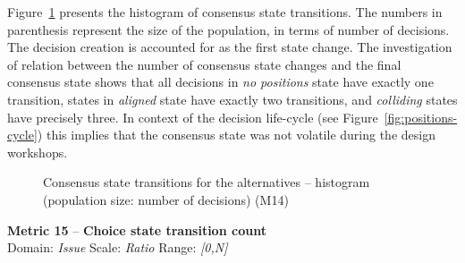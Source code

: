 \documentclass[article]{elsarticle}
\begin{document}
Figure~\ref{fig:M14} presents the histogram of consensus state transitions. The numbers in parenthesis represent the size of the population, in terms of number of decisions. The decision creation is accounted for as the first state change. The investigation of relation between the number of consensus state changes and the final consensus state shows that all decisions in \emph{no positions} state have exactly one transition, states in \emph{aligned} state have exactly two transitions, and \emph{colliding} states have precisely three. In context of the decision life-cycle (see Figure~\ref{fig:positions-cycle}) this implies that the consensus state was not volatile during the design workshops.  
\begin{figure}
  \begin{center}
 

  \caption{Consensus state transitions for the alternatives -- histogram (population size: number of decisions) (M14)}
  \label{fig:M14}
  \end{center}
\end{figure}

\vspace{1em}
\noindent
\textbf{Metric 15} -- \textbf{Choice state transition count}\\
Domain: \emph{Issue} Scale: \emph{Ratio} Range: \emph{[0,N]}\\
\end{document}

